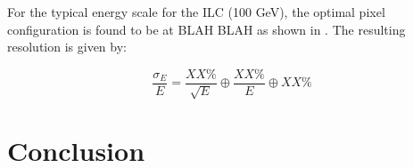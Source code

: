 For the typical energy scale for the \ac{ILC} (100 GeV), the optimal pixel configuration is found to be at BLAH BLAH as shown in . The resulting resolution is given by:

\begin{equation}
  \frac{\sigma_E}{E}=\frac{XX\%}{\sqrt{E}} \oplus \frac{XX\%}{E} \oplus XX\%
\end{equation}



\section{Conclusion}

